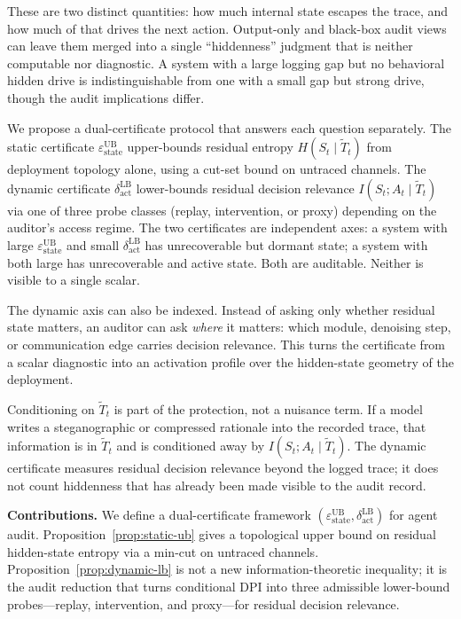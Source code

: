 \documentclass{article}
\begin{document}
These are two distinct quantities: how much internal state escapes the trace, and how much of that drives the next action. Output-only and black-box audit views can leave them merged into a single ``hiddenness'' judgment that is neither computable nor diagnostic. A system with a large logging gap but no behavioral hidden drive is indistinguishable from one with a small gap but strong drive, though the audit implications differ.

We propose a dual-certificate protocol that answers each question separately. The static certificate $\varepsilon_\text{state}^\text{UB}$ upper-bounds residual entropy $H(S_t \mid \tilde T_t)$ from deployment topology alone, using a cut-set bound on untraced channels. The dynamic certificate $\delta_\text{act}^\text{LB}$ lower-bounds residual decision relevance $I(S_t; A_t \mid \tilde T_t)$ via one of three probe classes (replay, intervention, or proxy) depending on the auditor's access regime. The two certificates are independent axes: a system with large $\varepsilon_\text{state}^\text{UB}$ and small $\delta_\text{act}^\text{LB}$ has unrecoverable but dormant state; a system with both large has unrecoverable and active state. Both are auditable. Neither is visible to a single scalar.

The dynamic axis can also be indexed. Instead of asking only whether residual state matters, an auditor can ask \emph{where} it matters: which module, denoising step, or communication edge carries decision relevance. This turns the certificate from a scalar diagnostic into an activation profile over the hidden-state geometry of the deployment.

Conditioning on $\tilde T_t$ is part of the protection, not a nuisance term. If a model writes a steganographic or compressed rationale into the recorded trace, that information is in $\tilde T_t$ and is conditioned away by $I(S_t; A_t \mid \tilde T_t)$. The dynamic certificate measures residual decision relevance beyond the logged trace; it does not count hiddenness that has already been made visible to the audit record.

\textbf{Contributions.} We define a dual-certificate framework $(\varepsilon_\text{state}^\text{UB}, \delta_\text{act}^\text{LB})$ for agent audit. Proposition~\ref{prop:static-ub} gives a topological upper bound on residual hidden-state entropy via a min-cut on untraced channels. Proposition~\ref{prop:dynamic-lb} is not a new information-theoretic inequality; it is the audit reduction that turns conditional DPI into three admissible lower-bound probes---replay, intervention, and proxy---for residual decision relevance.
\end{document}
